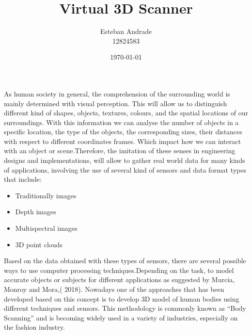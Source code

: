 \documentclass[a4paper]{thesis}
\title{\Large{\textbf{Virtual 3D Scanner}}}
\author{Esteban Andrade\\ 
12824583}
\date{\today}
\begin{document}
\section*{}
As human society in general, the comprehension of the surrounding world is mainly determined with visual perception.
This will allow us to distinguish different kind of shapes, objects, textures, colours, and the spatial locations of our surroundings.
With this information we can analyse the number of objects in a specific location, the type of the objects, the corresponding sizes, their distances with respect to different coordinates frames.
Which impact how we can interact with an object or scene.Therefore, the imitation of these senses in engineering designs and implementations, will allow to gather real world data for many kinds of applications, involving the use of several kind of sensors and data format types that include: 
 \begin{itemize}
    \itemsep0em 
     \item Traditionally images
     \item Depth images
     \item Multispectral images
     \item 3D point clouds 
 \end{itemize}
 Based on the data obtained with these types of sensors, there are several possible ways to use computer processing techniques.Depending on the task, to model accurate objects or subjects for different applications as suggested by Murcia, Monroy and Mora,( 2018). 
 Nowadays one of the approaches that has been developed based on this concept is to develop 3D model of human bodies using different techniques and sensors.
 This methodology is commonly known as “Body Scanning” and is becoming widely used in a variety of industries, especially on the fashion industry. 
 
\end{document}
